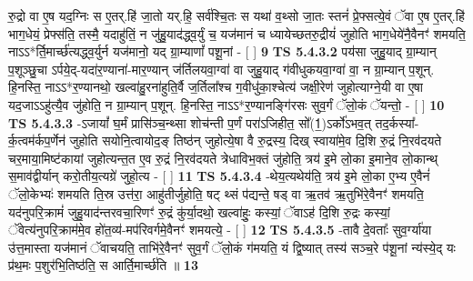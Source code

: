 \documentclass[17pt]{extarticle}
\begin{document}
                  रु॒द्रो वा ए॒ष यद॒ग्निः स ए॒तर्.हि॑ जा॒तो यर्.हि॒ सर्व॑श्चि॒तः स यथा॑ व॒थ्सो जा॒तः स्तनं॑ प्रे॒फ्सत्ये॒वं ॅवा ए॒ष ए॒तर्.हि॑ भाग॒धेयं॒ प्रेफ्स॑ति॒ तस्मै॒ यदाहु॑तिं॒ न जु॑हु॒याद॑द्ध्व॒र्युं च॒ यज॑मानं च ध्यायेच्छतरु॒द्रीयं॑ जुहोति भाग॒धेये॑नै॒वैनꣳ॑ शमयति॒ नाऽऽ*र्ति॒मार्च्छ॑त्यद्ध्व॒र्युर्न यज॑मानो॒ यद् ग्रा॒म्याणां᳚ पशू॒नां - [  ] \textbf{  9} \newline
                  \newline
                                \textbf{ TS 5.4.3.2} \newline
                  पय॑सा जुहु॒याद् ग्रा॒म्यान् प॒शूञ्छु॒चा ऽर्पये॒द्-यदा॑र॒ण्याना॑-मार॒ण्यान् ज॑र्तिलयवा॒ग्वा॑ वा जुहु॒याद् ग॑वीधुकयवा॒ग्वा॑ वा॒ न ग्रा॒म्यान् प॒शून्. हि॒नस्ति॒ नाऽऽ*र॒ण्यानथो॒ खल्वा॑हु॒रना॑हुति॒र्वै ज॒र्तिला᳚श्च ग॒वीधु॑का॒श्चेत्य॑ जक्षी॒रेण॑ जुहोत्याग्ने॒यी वा ए॒षा यद॒जाऽऽहु॑त्यै॒व जु॑होति॒ न ग्रा॒म्यान् प॒शून्. हि॒नस्ति॒ नाऽऽ*र॒ण्यानङ्गि॑रसः सुव॒र्गं ॅलो॒कं ॅयन्तो॒ - [  ] \textbf{  10} \newline
                  \newline
                                \textbf{ TS 5.4.3.3} \newline
                  -ऽजायां᳚ घ॒र्मं प्रासि॑ञ्च॒न्थ्सा शोच॑न्ती प॒र्णं परा॑ऽजिहीत॒ सो᳚(1॒)ऽर्को॑ऽभव॒त् तद॒र्कस्या᳚-र्क॒त्वम॑र्कप॒र्णेन॑ जुहोति सयोनि॒त्वायोद॒ङ् तिष्ठ॑न् जुहोत्ये॒षा वै रु॒द्रस्य॒ दिख् स्वाया॑मे॒व दि॒शि रु॒द्रं नि॒रव॑दयते चर॒माया॒मिष्ट॑कायां जुहोत्यन्त॒त ए॒व रु॒द्रं नि॒रव॑दयते त्रेधाविभ॒क्तं जु॑होति॒ त्रय॑ इ॒मे लो॒का इ॒माने॒व लो॒कान्थ् स॒माव॑द्वीर्यान् करो॒तीय॒त्यग्रे॑ जुहो॒त्य - [  ] \textbf{  11} \newline
                  \newline
                                \textbf{ TS 5.4.3.4} \newline
                  -थेय॒त्यथेय॑ति॒ त्रय॑ इ॒मे लो॒का ए॒भ्य ए॒वैनं॑ ॅलो॒केभ्यः॑ शमयति ति॒स्र उत्त॑रा॒ आहु॑तीर्जुहोति॒ षट् थ्सं प॑द्यन्ते॒ षड् वा ऋ॒तव॑ ऋ॒तुभि॑रे॒वैनꣳ॑ शमयति॒ यद॑नुपरि॒क्रामं॑ जुहु॒याद॑न्तरवचा॒रिणꣳ॑ रु॒द्रं कु॑र्या॒दथो॒ खल्वा॑हुः॒ कस्यां॒ ॅवाऽह॑ दि॒शि रु॒द्रः कस्यां॒ ॅवेत्य॑नुपरि॒क्राम॑मे॒व हो॑त॒व्य॑-मप॑रिवर्गमे॒वैनꣳ॑ शमयत्ये॒ - [  ] \textbf{  12} \newline
                  \newline
                                \textbf{ TS 5.4.3.5} \newline
                  -तावै दे॒वताः᳚ सुव॒र्ग्या॑या उ॑त्त॒मास्ता यज॑मानं ॅवाचयति॒ ताभि॑रे॒वैनꣳ॑ सुव॒र्गं ॅलो॒कं ग॑मयति॒ यं द्वि॒ष्यात् तस्य॑ सञ्च॒रे प॑शू॒नां न्य॑स्ये॒द् यः प्र॑थ॒मः प॒शुर॑भि॒तिष्ठ॑ति॒ स आर्ति॒मार्च्छ॑ति ॥ \textbf{  13 } \newline
\end{document}
